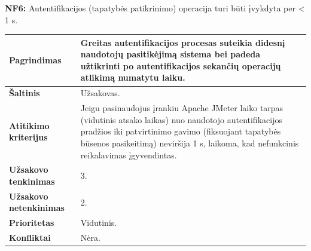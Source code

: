 \documentclass[12pt]{article}
\begin{document}
\noindent \textbf{NF6:} Autentifikacijos (tapatybės patikrinimo) operacija turi
būti įvykdyta per < 1 s.
\label{sec:NF6}
\begin{table}[htb!]
    \captionsetup{justification=centering}
    \vskip -10pt
    \begin{tabular}{|m{4.9cm}|m{11cm}|}
        \hline
        \raggedleft \textbf{\cellcolor{deepchampagne}Pagrindimas} &
        Greitas autentifikacijos procesas suteikia didesnį naudotojų
        pasitikėjimą sistema bei padeda užtikrinti po autentifikacijos sekančių
        operacijų atlikimą numatytu laiku. \\
        \hline
        \raggedleft \textbf{\cellcolor{deepchampagne}Šaltinis} & Užsakovas. \\
        \hline
        \raggedleft \textbf{\cellcolor{deepchampagne}Atitikimo kriterijus} & 
        Jeigu pasinaudojus įrankiu Apache JMeter laiko tarpas (vidutinis atsako
        laikas) nuo naudotojo autentifikacijos pradžios iki patvirtinimo gavimo
        (fiksuojant tapatybės būsenos pasikeitimą) neviršija 1 s, laikoma, kad
        nefunkcinis reikalavimas įgyvendintas. \\
        \hline
        \raggedleft \textbf{\cellcolor{deepchampagne}Užsakovo tenkinimas} & 3. \\
        \hline
        \raggedleft \textbf{\cellcolor{deepchampagne}Užsakovo netenkinimas} & 2. \\
        \hline
        \raggedleft \textbf{\cellcolor{deepchampagne}Prioritetas} & Vidutinis. \\
        \hline
        \raggedleft \textbf{\cellcolor{deepchampagne}Konfliktai} & Nėra. \\
        \hline
    \end{tabular}
\end{table}
\end{document}
